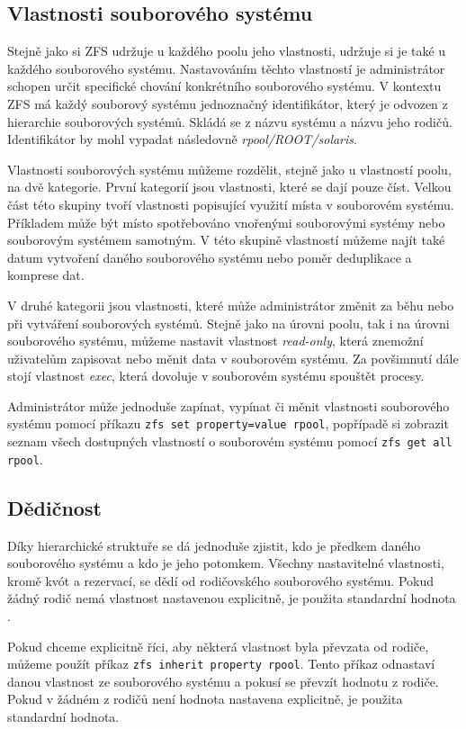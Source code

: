 \subsection{Vlastnosti souborového systému}
Stejně jako si ZFS udržuje u každého poolu jeho vlastnosti, udržuje si je také u každého souborového systému. Nastavováním těchto vlastností je administrátor schopen určit specifické chování konkrétního souborového systému. V kontextu ZFS má každý souborový systému jednoznačný identifikátor, který je odvozen z hierarchie souborových systémů. Skládá se z názvu systému a názvu jeho rodičů. Identifikátor by mohl vypadat následovně \emph{rpool/ROOT/solaris}.

Vlastnosti souborových systému můžeme rozdělit, stejně jako u vlastností poolu, na dvě kategorie. První kategorií jsou vlastnosti, které se dají pouze číst. Velkou část této skupiny tvoří vlastnosti popisující využití místa v souborovém systému. Příkladem může být místo spotřebováno vnořenými souborovými systémy nebo souborovým systémem samotným. V této skupině vlastností můžeme najít také datum vytvoření daného souborového systému nebo poměr deduplikace a komprese dat.

V druhé kategorii jsou vlastnosti, které může administrátor změnit za běhu nebo při vytváření souborových systémů. Stejně jako na úrovni poolu, tak i na úrovni souborového systému, můžeme nastavit vlastnost \emph{read-only}, která znemožní uživatelům zapisovat nebo měnit data v souborovém systému. Za povšimnutí dále stojí vlastnost \emph{exec}, která dovoluje v souborovém systému spouštět procesy.

Administrátor může jednoduše zapínat, vypínat či měnit vlastnosti souborového systému pomocí příkazu \verb|zfs set property=value rpool|, popřípadě si zobrazit seznam všech dostupných vlastností o souborovém systému pomocí \verb|zfs get all rpool|.

\subsection{Dědičnost}
Díky hierarchické struktuře se dá jednoduše zjistit, kdo je předkem daného souborového systému a kdo je jeho potomkem. Všechny nastavitelné vlastnosti, kromě kvót a rezervací, se dědí od rodičovského souborového systému. Pokud žádný rodič nemá vlastnost nastavenou explicitně, je použita standardní hodnota \cite{inheriting}.

Pokud chceme explicitně říci, aby některá vlastnost byla převzata od rodiče, můžeme použít příkaz \verb|zfs inherit property rpool|. Tento příkaz odnastaví danou vlastnost ze souborového systému a pokusí se převzít hodnotu z rodiče. Pokud v žádném z rodičů není hodnota nastavena explicitně, je použita standardní hodnota.

